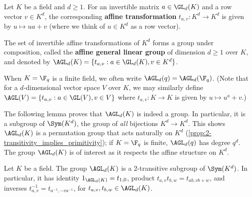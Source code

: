 \begin{definition}\label{def:affine_transformation}
    Let $K$ be a field and $d \geq 1$. For an invertible matrix $a \in \GL_d(K)$ and a row vector $v \in K^d$, the corresponding \textbf{affine transformation} $t_{a,v} : K^d \to K^d$ is given by $u \mapsto ua + v$ (where we think of $u \in K^d$ as a row vector).
\end{definition}

\begin{definition}\label{def:agl}
    The set of invertible affine transformations of $K^d$ forms a group under composition, called the \textbf{affine general linear group} of dimension $d \geq 1$ over $K$, and denoted by $\AGL_d(K) = \{t_{a,v} : a \in \GL_d(K), v \in K^d\}$.

    When $K = \F_q$ is a finite field, we often write $\AGL_d(q) = \AGL_d(\F_q)$. (Note that for a $d$-dimensional vector space $V$ over $K$, we may similarly define $\AGL(V) = \{t_{a,v} : a \in \GL(V), v \in V\}$ where $t_{a,v} : K \to K$ is given by $u \mapsto u^a + v$.)
\end{definition}

The following lemma proves that $\AGL_d(K)$ is indeed a group. In particular, it is a  subgroup of $\Sym(K^d)$, the group of \textit{all} bijections $K^d \to K^d$. This shows $\AGL_d(K)$ is a  permutation group that acts naturally on $K^d$ (\autoref{prop:2-transitivity_implies_primitivity}); if $K = \F_q$ is finite, $\AGL_d(q)$ has degree $q^d$. The group $\AGL_d(K)$ is of interest as it respects the affine structure on $K^d$.

\begin{lemma}\label{lem:agl_is_subgroup}
    Let $K$ be a field. The group $\AGL_d(K)$ is a 2-transitive subgroup of $\Sym(K^d)$. In particular, it has identity $1_{\AGL_d(K)} = t_{1,0}$, product $t_{a,v}t_{b,w} = t_{ab,vb+w}$, and inverses $t_{a,v}^{-1} = t_{a^{-1},-va^{-1}}$, for $t_{a,v},t_{b,w} \in \AGL_d(K)$.
\end{lemma}

